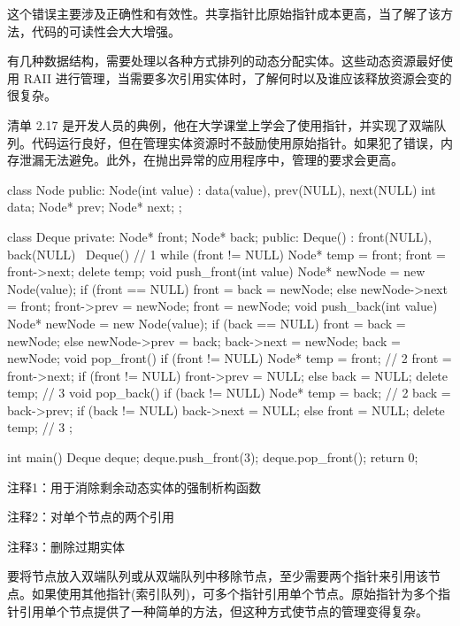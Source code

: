 这个错误主要涉及正确性和有效性。共享指针比原始指针成本更高，当了解了该方法，代码的可读性会大大增强。


有几种数据结构，需要处理以各种方式排列的动态分配实体。这些动态资源最好使用 RAII 进行管理，当需要多次引用实体时，了解何时以及谁应该释放资源会变的很复杂。

清单 2.17 是开发人员的典例，他在大学课堂上学会了使用指针，并实现了双端队列。代码运行良好，但在管理实体资源时不鼓励使用原始指针。如果犯了错误，内存泄漏无法避免。此外，在抛出异常的应用程序中，管理的要求会更高。


\begin{cpp}
class Node {
public:
  Node(int value) : data(value), prev(NULL), next(NULL) {}
  int data;
  Node* prev;
  Node* next;
};

class Deque {
private:
  Node* front;
  Node* back;
public:
  Deque() : front(NULL), back(NULL) {}
  ~Deque() { // 1
    while (front != NULL) {
      Node* temp = front;
      front = front->next;
      delete temp;
    }
  }
  void push_front(int value) {
    Node* newNode = new Node(value);
    if (front == NULL)
      front = back = newNode;
    else {
      newNode->next = front;
      front->prev = newNode;
      front = newNode;
    }
  }
  void push_back(int value) {
    Node* newNode = new Node(value);
    if (back == NULL)
      front = back = newNode;
    else {
      newNode->prev = back;
      back->next = newNode;
      back = newNode;
    }
  }
  void pop_front() {
    if (front != NULL) {
      Node* temp = front; // 2
      front = front->next;
      if (front != NULL)
        front->prev = NULL;
      else
        back = NULL;
      delete temp; // 3
    }
  }
  void pop_back() {
    if (back != NULL) {
      Node* temp = back; // 2
      back = back->prev;
      if (back != NULL)
        back->next = NULL;
      else
        front = NULL;
      delete temp; // 3
    }
  }
};

int main() {
  Deque deque;
  deque.push_front(3);
  deque.pop_front();
  return 0;
}
\end{cpp}

{\footnotesize
注释1：用于消除剩余动态实体的强制析构函数

注释2：对单个节点的两个引用

注释3：删除过期实体
}


要将节点放入双端队列或从双端队列中移除节点，至少需要两个指针来引用该节点。如果使用其他指针(索引队列)，可多个指针引用单个节点。原始指针为多个指针引用单个节点提供了一种简单的方法，但这种方式使节点的管理变得复杂。

